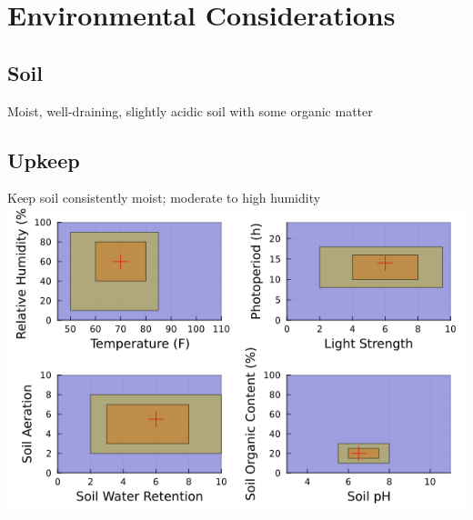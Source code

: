 \documentclass{article}
\begin{document}
\section*{Environmental Considerations}
\subsection*{Soil}
Moist, well-draining, slightly acidic soil with some organic matter
\subsection*{Upkeep}
Keep soil consistently moist; moderate to high humidity
\newline \newline \newline
\includegraphics[width=.9\textwidth]{intermediate/plots/Peppermint.png}
\end{document}
